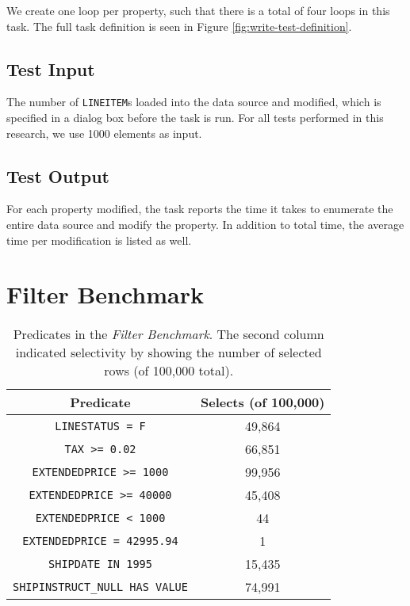We create one loop per property, such that there is a total of four loops in this task. The full task definition is seen in Figure \ref{fig:write-test-definition}.

\subsection{Test Input}
\label{sub:Test Input}
The number of \texttt{LINEITEM}s loaded into the data source and modified, which is specified in a dialog box before the task is run. For all tests performed in this research, we use 1000 elements as input.

\subsection{Test Output}
\label{sub:Test Output}
For each property modified, the task reports the time it takes to enumerate the entire data source and modify the property. In addition to total time, the average time per modification is listed as well.

\section{Filter Benchmark}
\label{bm:filter}
\begin{table}
    \centering
    \begin{tabular}{c | c}
        Predicate & Selects (of 100,000) \\
        \hline
        \hline
        \texttt{LINESTATUS = F} & 49,864 \\
        \texttt{TAX >= 0.02} & 66,851 \\
        \texttt{EXTENDEDPRICE >= 1000} & 99,956 \\
        \texttt{EXTENDEDPRICE >= 40000} & 45,408\\
        \texttt{EXTENDEDPRICE < 1000} & 44 \\
        \texttt{EXTENDEDPRICE = 42995.94} & 1 \\
        \texttt{SHIPDATE IN 1995} & 15,435 \\
        \texttt{SHIPINSTRUCT\_NULL HAS VALUE} & 74,991 \\
    \end{tabular}
    \caption{Predicates in the \textit{Filter Benchmark}. The second column indicated selectivity by showing the number of selected rows (of 100,000 total).}
    \label{tab:Filter Test}
\end{table}

